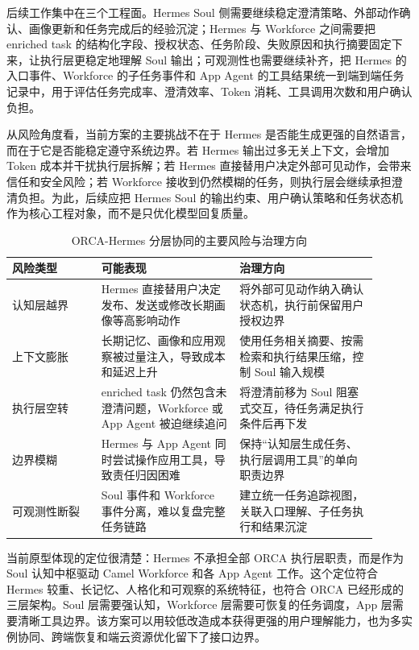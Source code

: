 后续工作集中在三个工程面。Hermes Soul 侧需要继续稳定澄清策略、外部动作确认、画像更新和任务完成后的经验沉淀；Hermes 与 Workforce 之间需要把 enriched task 的结构化字段、授权状态、任务阶段、失败原因和执行摘要固定下来，让执行层更稳定地理解 Soul 输出；可观测性也需要继续补齐，把 Hermes 的入口事件、Workforce 的子任务事件和 App Agent 的工具结果统一到端到端任务记录中，用于评估任务完成率、澄清效率、Token 消耗、工具调用次数和用户确认负担。

从风险角度看，当前方案的主要挑战不在于 Hermes 是否能生成更强的自然语言，而在于它是否能稳定遵守系统边界。若 Hermes 输出过多无关上下文，会增加 Token 成本并干扰执行层拆解；若 Hermes 直接替用户决定外部可见动作，会带来信任和安全风险；若 Workforce 接收到仍然模糊的任务，则执行层会继续承担澄清负担。为此，后续应把 Hermes Soul 的输出约束、用户确认策略和任务状态机作为核心工程对象，而不是只优化模型回复质量。

\begin{table}[h]
\centering
\begin{tabular}{p{0.22\linewidth}p{0.34\linewidth}p{0.34\linewidth}}
\hline
\textbf{风险类型} & \textbf{可能表现} & \textbf{治理方向} \\
\hline
认知层越界 & Hermes 直接替用户决定发布、发送或修改长期画像等高影响动作 & 将外部可见动作纳入确认状态机，执行前保留用户授权边界 \\
上下文膨胀 & 长期记忆、画像和应用观察被过量注入，导致成本和延迟上升 & 使用任务相关摘要、按需检索和执行结果压缩，控制 Soul 输入规模 \\
执行层空转 & enriched task 仍然包含未澄清问题，Workforce 或 App Agent 被迫继续追问 & 将澄清前移为 Soul 阻塞式交互，待任务满足执行条件后再下发 \\
边界模糊 & Hermes 与 App Agent 同时尝试操作应用工具，导致责任归因困难 & 保持“认知层生成任务、执行层调用工具”的单向职责边界 \\
可观测性断裂 & Soul 事件和 Workforce 事件分离，难以复盘完整任务链路 & 建立统一任务追踪视图，关联入口理解、子任务执行和结果沉淀 \\
\hline
\end{tabular}
\caption{ORCA-Hermes 分层协同的主要风险与治理方向}
\label{tab:rt3-risk-governance}
\end{table}

当前原型体现的定位很清楚：Hermes 不承担全部 ORCA 执行层职责，而是作为 Soul 认知中枢驱动 Camel Workforce 和各 App Agent 工作。这个定位符合 Hermes 较重、长记忆、人格化和可观察的系统特征，也符合 ORCA 已经形成的三层架构。Soul 层需要强认知，Workforce 层需要可恢复的任务调度，App 层需要清晰工具边界。该方案可以用较低改造成本获得更强的用户理解能力，也为多实例协同、跨端恢复和端云资源优化留下了接口边界。
